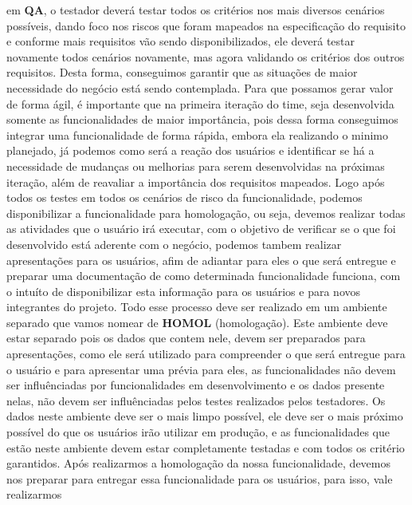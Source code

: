    em \textbf{QA}, o testador deverá testar todos os critérios nos mais diversos
    cenários possíveis, dando foco nos riscos que foram mapeados na especificação
    do requisito e conforme mais requisitos vão sendo disponibilizados, ele deverá
    testar novamente todos cenários novamente, mas agora validando os critérios
    dos outros requisitos. Desta forma, conseguimos garantir que as situações de
    maior necessidade do negócio está sendo contemplada. Para que possamos gerar
    valor de forma ágil, é importante que na primeira iteração do time, seja
    desenvolvida somente as funcionalidades de maior importância, pois dessa
    forma conseguimos integrar uma funcionalidade de forma rápida, embora ela
    realizando o minimo planejado, já podemos como será a reação dos usuários e
    identificar se há a necessidade de mudanças ou melhorias para serem desenvolvidas
    na próximas iteração, além de reavaliar a importância dos requisitos mapeados. \newline
    Logo após todos os testes em todos os cenários de risco da funcionalidade,
    podemos disponibilizar a funcionalidade para homologação, ou seja, devemos
    realizar todas as atividades que o usuário irá executar, com o objetivo de
    verificar se o que foi desenvolvido está aderente com o negócio, podemos
    tambem realizar apresentações para os usuários, afim de adiantar para eles
    o que será entregue e preparar uma documentação de como determinada funcionalidade
    funciona, com o intuíto de disponibilizar esta informação para os usuários e
    para novos integrantes do projeto. Todo esse processo deve ser realizado em
    um ambiente separado que vamos nomear de \textbf{HOMOL} (homologação). Este ambiente deve
    estar separado pois os dados que contem nele, devem ser preparados para
    apresentações, como ele será utilizado para compreender o que será entregue
    para o usuário e para apresentar uma prévia para eles, as funcionalidades
    não devem ser influênciadas por funcionalidades em desenvolvimento e os
    dados presente nelas, não devem ser influênciadas pelos testes realizados
    pelos testadores. Os dados neste ambiente deve ser o mais limpo possível,
    ele deve ser o mais próximo possível do que os usuários irão utilizar em
    produção, e as funcionalidades que estão neste ambiente devem estar completamente
    testadas e com todos os critério garantidos. \newline
    Após realizarmos a homologação da nossa funcionalidade, devemos nos preparar
    para entregar essa funcionalidade para os usuários, para isso, vale realizarmos
